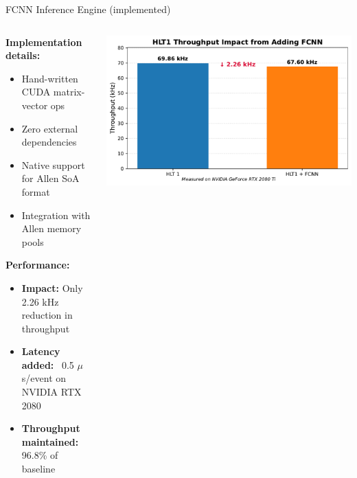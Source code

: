 \documentclass[10pt,aspectratio=169]{beamer}
\begin{document}
\begin{frame}{FCNN Inference Engine (implemented)}
  \begin{columns}[T]
    \begin{column}{0.58\textwidth}
      \textbf{Implementation details:}
      \begin{itemize}
        \item Hand-written CUDA matrix-vector ops
        \item Zero external dependencies
        \item Native support for Allen SoA format
        \item Integration with Allen memory pools
      \end{itemize}

    \textbf{Performance:}
    \begin{itemize}
      \item \textbf{Impact:} Only 2.26 kHz reduction in throughput
      \item \textbf{Latency added:} ~0.5 $\mu$s/event on NVIDIA RTX 2080
      \item \textbf{Throughput maintained:} 96.8\% of baseline
    \end{itemize}
    \end{column}
    
    \begin{column}{0.45\textwidth}
\includegraphics[width=1.1\textwidth]{figures/pvfinder_fcnn_impact.pdf}
    \end{column}
  \end{columns}

\end{frame}
\end{document}
